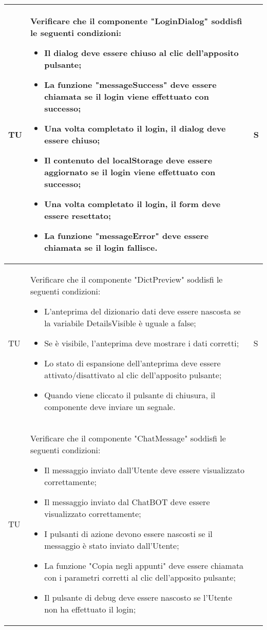 \begin{adjustwidth}{-0.5cm}{-0.5cm}
\begin{longtable}{|P{1.5cm}|>{\raggedright}P{9.5cm}|>{\arraybackslash}P{1.5cm}|}
		\hline TU & Verificare che il componente "LoginDialog" soddisfi le seguenti condizioni:
    \begin{itemize}
      \item Il dialog deve essere chiuso al clic dell'apposito pulsante;
			\item La funzione "messageSuccess" deve essere chiamata se il login viene effettuato con successo;
			\item Una volta completato il login, il dialog deve essere chiuso;
			\item Il contenuto del localStorage deve essere aggiornato se il login viene effettuato con successo;
			\item Una volta completato il login, il form deve essere resettato;
			\item La funzione "messageError" deve essere chiamata se il login fallisce.
    \end{itemize} & S \\
		\hline TU & Verificare che il componente "DictPreview" soddisfi le seguenti condizioni:
    \begin{itemize}
      \item L'anteprima del dizionario dati deve essere nascosta se la variabile DetailsVisible è uguale a false;
			\item Se è visibile, l'anteprima deve mostrare i dati corretti;
			\item Lo stato di espansione dell'anteprima deve essere attivato/disattivato al clic dell'apposito pulsante;
			\item Quando viene cliccato il pulsante di chiusura, il componente deve inviare un segnale.
    \end{itemize} & S \\
		\hline TU & Verificare che il componente "ChatMessage" soddisfi le seguenti condizioni:
    \begin{itemize}
      \item Il messaggio inviato dall'Utente deve essere visualizzato correttamente;
			\item Il messaggio inviato dal ChatBOT deve essere visualizzato correttamente;
			\item I pulsanti di azione devono essere nascosti se il messaggio è stato inviato dall'Utente;
			\item La funzione "Copia negli appunti" deve essere chiamata con i parametri corretti al clic dell'apposito pulsante;
			\item Il pulsante di debug deve essere nascosto se l'Utente non ha effettuato il login;

\end{itemize}
\end{longtable}
\end{adjustwidth}
